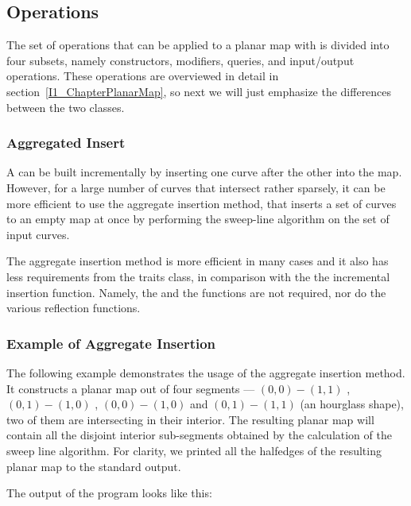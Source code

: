 \subsection{Operations}
The set of operations that can be applied to a planar map with
 is divided into four subsets, namely
constructors, modifiers, queries, and input/output operations. These
operations are overviewed in detail in section~\ref{I1_ChapterPlanarMap},
so next we will just emphasize the differences between the two classes.

\subsubsection{Aggregated Insert}

A  can be built incrementally by
inserting one curve after the other into the map. However, for a large number
of curves that intersect rather sparsely, it can be more efficient to use the
aggregate insertion method, that inserts a set of curves to an empty map at
once by performing the sweep-line algorithm on the set of input curves.

The aggregate insertion method is more efficient in many cases and it also
has less requirements from the traits class, in comparison with the the
incremental insertion function. Namely, the  and the  functions are not required, nor do
the various reflection functions.

\subsubsection{Example of Aggregate Insertion}
\label{sssec:example1_aggrinsrt}
The following example demonstrates the usage of the aggregate insertion
method. It constructs a planar map out of four segments --- 
$(0,0)-(1,1)$ , $(0,1)-(1,0)$ , $(0,0)-(1,0)$ and $(0,1)-(1,1)$
(an hourglass shape), two of them are intersecting in their interior. 
The resulting planar map will contain all the disjoint interior sub-segments 
obtained by the calculation of the sweep line algorithm. For clarity, we printed all the halfedges of the resulting planar map to the standard output.


The output of the program looks like this:

